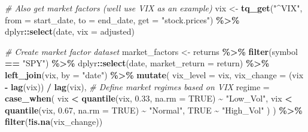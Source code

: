 \documentclass[
]{article}
\newenvironment{Shaded}{\begin{snugshade}}{\end{snugshade}}
\newcommand{\AttributeTok}[1]{\textcolor[rgb]{0.13,0.29,0.53}{#1}}
\newcommand{\CommentTok}[1]{\textcolor[rgb]{0.56,0.35,0.01}{\textit{#1}}}
\newcommand{\ConstantTok}[1]{\textcolor[rgb]{0.56,0.35,0.01}{#1}}
\newcommand{\FloatTok}[1]{\textcolor[rgb]{0.00,0.00,0.81}{#1}}
\newcommand{\FunctionTok}[1]{\textcolor[rgb]{0.13,0.29,0.53}{\textbf{#1}}}
\newcommand{\NormalTok}[1]{#1}
\newcommand{\OtherTok}[1]{\textcolor[rgb]{0.56,0.35,0.01}{#1}}
\newcommand{\SpecialCharTok}[1]{\textcolor[rgb]{0.81,0.36,0.00}{\textbf{#1}}}
\newcommand{\StringTok}[1]{\textcolor[rgb]{0.31,0.60,0.02}{#1}}
\begin{document}
\begin{Shaded}
\begin{Highlighting}[]
\CommentTok{\# Also get market factors (we\textquotesingle{}ll use VIX as an example)}
\NormalTok{vix }\OtherTok{\textless{}{-}} \FunctionTok{tq\_get}\NormalTok{(}\StringTok{"\^{}VIX"}\NormalTok{, }\AttributeTok{from =}\NormalTok{ start\_date, }\AttributeTok{to =}\NormalTok{ end\_date, }\AttributeTok{get =} \StringTok{"stock.prices"}\NormalTok{) }\SpecialCharTok{\%\textgreater{}\%}
\NormalTok{  dplyr}\SpecialCharTok{::}\FunctionTok{select}\NormalTok{(date, }\AttributeTok{vix =}\NormalTok{ adjusted)}

\CommentTok{\# Create market factor dataset}
\NormalTok{market\_factors }\OtherTok{\textless{}{-}}\NormalTok{ returns }\SpecialCharTok{\%\textgreater{}\%}
  \FunctionTok{filter}\NormalTok{(symbol }\SpecialCharTok{==} \StringTok{"SPY"}\NormalTok{) }\SpecialCharTok{\%\textgreater{}\%}
\NormalTok{  dplyr}\SpecialCharTok{::}\FunctionTok{select}\NormalTok{(date, }\AttributeTok{market\_return =}\NormalTok{ return) }\SpecialCharTok{\%\textgreater{}\%}
  \FunctionTok{left\_join}\NormalTok{(vix, }\AttributeTok{by =} \StringTok{"date"}\NormalTok{) }\SpecialCharTok{\%\textgreater{}\%}
  \FunctionTok{mutate}\NormalTok{(}
    \AttributeTok{vix\_level =}\NormalTok{ vix,}
    \AttributeTok{vix\_change =}\NormalTok{ (vix }\SpecialCharTok{{-}} \FunctionTok{lag}\NormalTok{(vix)) }\SpecialCharTok{/} \FunctionTok{lag}\NormalTok{(vix),}
    \CommentTok{\# Define market regimes based on VIX}
    \AttributeTok{regime =} \FunctionTok{case\_when}\NormalTok{(}
\NormalTok{      vix }\SpecialCharTok{\textless{}} \FunctionTok{quantile}\NormalTok{(vix, }\FloatTok{0.33}\NormalTok{, }\AttributeTok{na.rm =} \ConstantTok{TRUE}\NormalTok{) }\SpecialCharTok{\textasciitilde{}} \StringTok{"Low\_Vol"}\NormalTok{,}
\NormalTok{      vix }\SpecialCharTok{\textless{}} \FunctionTok{quantile}\NormalTok{(vix, }\FloatTok{0.67}\NormalTok{, }\AttributeTok{na.rm =} \ConstantTok{TRUE}\NormalTok{) }\SpecialCharTok{\textasciitilde{}} \StringTok{"Normal"}\NormalTok{,}
      \ConstantTok{TRUE} \SpecialCharTok{\textasciitilde{}} \StringTok{"High\_Vol"}
\NormalTok{    )}
\NormalTok{  ) }\SpecialCharTok{\%\textgreater{}\%}
  \FunctionTok{filter}\NormalTok{(}\SpecialCharTok{!}\FunctionTok{is.na}\NormalTok{(vix\_change))}


\end{Highlighting}
\end{Shaded}
\end{document}
